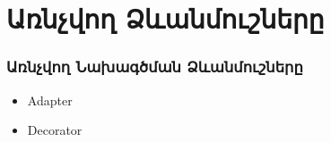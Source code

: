 \documentclass{beamer}
\begin{document}
\section{Առնչվող Ձևանմուշները}
\begin{frame}\frametitle{Առնչվող Նախագծման Ձևանմուշները}
\begin{itemize}
    \item Adapter \vfill
    \item Decorator
\end{itemize}
\end{frame}
\end{document}
